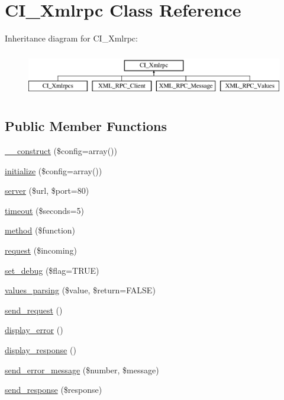 \hypertarget{class_c_i___xmlrpc}{\section{C\-I\-\_\-\-Xmlrpc Class Reference}
\label{class_c_i___xmlrpc}
}
Inheritance diagram for C\-I\-\_\-\-Xmlrpc\-:\begin{figure}[H]
\begin{center}
\leavevmode
\includegraphics[height=2.000000cm]{class_c_i___xmlrpc}
\end{center}
\end{figure}
\subsection*{Public Member Functions}
\begin{DoxyCompactItemize}
\item 
\hyperlink{class_c_i___xmlrpc_af7f9493844d2d66e924e3c1df51ce616}{\-\_\-\-\_\-construct} (\$config=array())
\item 
\hyperlink{class_c_i___xmlrpc_a481385e36d920f5a5005ace05c6cd016}{initialize} (\$config=array())
\item 
\hyperlink{class_c_i___xmlrpc_a73157f1025c772bfa2c8c710aea1ae1f}{server} (\$url, \$port=80)
\item 
\hyperlink{class_c_i___xmlrpc_ada3149e6290a7991c7dfc88c6c90f2db}{timeout} (\$seconds=5)
\item 
\hyperlink{class_c_i___xmlrpc_a3d7e090549ec52eba8cf65598eefa72c}{method} (\$function)
\item 
\hyperlink{class_c_i___xmlrpc_a10d4ec842c61f2301ecccc900500e4c8}{request} (\$incoming)
\item 
\hyperlink{class_c_i___xmlrpc_a277e289843ab2ff13a12441e1dd5cd37}{set\-\_\-debug} (\$flag=T\-R\-U\-E)
\item 
\hyperlink{class_c_i___xmlrpc_a544761a56ec064427da119066ddbc3ce}{values\-\_\-parsing} (\$value, \$return=F\-A\-L\-S\-E)
\item 
\hyperlink{class_c_i___xmlrpc_ad6f2431aec35ca073f3bdac3f0e8c66a}{send\-\_\-request} ()
\item 
\hyperlink{class_c_i___xmlrpc_adf0d809d39e17bc0e08387436db31386}{display\-\_\-error} ()
\item 
\hyperlink{class_c_i___xmlrpc_a3a8aedc2a1e6a67ad248dc6078ce8614}{display\-\_\-response} ()
\item 
\hyperlink{class_c_i___xmlrpc_a024ae8a44e09995c6d0b6cb50d8abd9a}{send\-\_\-error\-\_\-message} (\$number, \$message)
\item 
\hyperlink{class_c_i___xmlrpc_ac567feb54a4bda4cad24ff63d09267a1}{send\-\_\-response} (\$response)
\end{DoxyCompactItemize}
